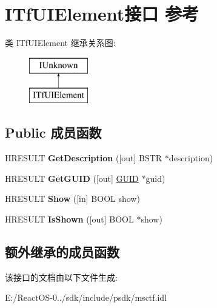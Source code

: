 \hypertarget{interface_i_tf_u_i_element}{}\section{I\+Tf\+U\+I\+Element接口 参考}
\label{interface_i_tf_u_i_element}
类 I\+Tf\+U\+I\+Element 继承关系图\+:\begin{figure}[H]
\begin{center}
\leavevmode
\includegraphics[height=2.000000cm]{interface_i_tf_u_i_element}
\end{center}
\end{figure}
\subsection*{Public 成员函数}
\begin{DoxyCompactItemize}
\item 
\mbox{\label{interface_i_tf_u_i_element_a7f5624186aa7d3ef0b75bd60ed4ed7a4}} 
H\+R\+E\+S\+U\+LT {\bfseries Get\+Description} (\mbox{[}out\mbox{]} B\+S\+TR $\ast$description)
\item 
\mbox{\label{interface_i_tf_u_i_element_a947977fb42c09c309bc7bf4e46f02907}} 
H\+R\+E\+S\+U\+LT {\bfseries Get\+G\+U\+ID} (\mbox{[}out\mbox{]} \hyperlink{interface_g_u_i_d}{G\+U\+ID} $\ast$guid)
\item 
\mbox{\label{interface_i_tf_u_i_element_a379e592170328220072c27d01f48f807}} 
H\+R\+E\+S\+U\+LT {\bfseries Show} (\mbox{[}in\mbox{]} B\+O\+OL show)
\item 
\mbox{\label{interface_i_tf_u_i_element_a11db8d772e81bc540523ef9a84e6b877}} 
H\+R\+E\+S\+U\+LT {\bfseries Is\+Shown} (\mbox{[}out\mbox{]} B\+O\+OL $\ast$show)
\end{DoxyCompactItemize}
\subsection*{额外继承的成员函数}


该接口的文档由以下文件生成\+:\begin{DoxyCompactItemize}
\item 
E\+:/\+React\+O\+S-\/0../sdk/include/psdk/msctf.\+idl\end{DoxyCompactItemize}
